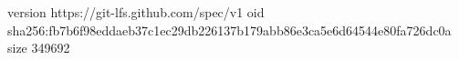 version https://git-lfs.github.com/spec/v1
oid sha256:fb7b6f98eddaeb37c1ec29db226137b179abb86e3ca5e6d64544e80fa726dc0a
size 349692
